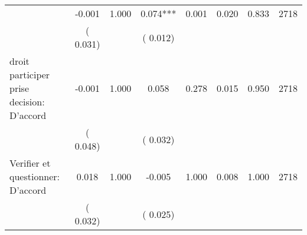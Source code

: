 \begin{tabular}{l*{7}{c}}
        &             -0.001       &        1.000  &              0.074***       &        0.001  &              0.020       &              0.833 &  2718 \\ 
                       &       (       0.031)             &                               &       (       0.012)                     &                               &                                               &                                &                      \\ 

 droit participer prise decision: D'accord       &             -0.001       &        1.000  &              0.058       &        0.278  &              0.015       &              0.950 &  2718 \\ 
                       &       (       0.048)             &                               &       (       0.032)                     &                               &                                               &                                &                      \\ 

 Verifier et questionner: D'accord       &              0.018       &        1.000  &             -0.005       &        1.000  &              0.008       &              1.000 &  2718 \\ 
                       &       (       0.032)             &                               &       (       0.025)                     &                               &                                               &                                &                      \\ 

\hline \end{tabular}